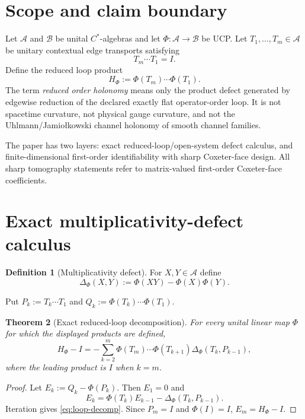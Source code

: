 \documentclass[11pt]{article}
\newtheorem{theorem}{Theorem}[section]
\theoremstyle{definition}
\newtheorem{definition}[theorem]{Definition}
\theoremstyle{remark}
\begin{document}
\section{Scope and claim boundary}
Let $\mathcal A$ and $\mathcal B$ be unital $C^*$-algebras and let $\Phi:\mathcal A\to\mathcal B$ be UCP. Let $T_1,\dots,T_m\in\mathcal A$ be unitary contextual edge transports satisfying
\begin{equation}\label{eq:flat-loop}
T_m\cdots T_1=I.
\end{equation}
Define the reduced loop product
\begin{equation}\label{eq:reduced-loop}
H_\Phi:=\Phi(T_m)\cdots\Phi(T_1).
\end{equation}
The term \emph{reduced order holonomy} means only the product defect generated by edgewise reduction of the declared exactly flat operator-order loop. It is not spacetime curvature, not physical gauge curvature, and not the Uhlmann/Jamio\l kowski channel holonomy of smooth channel families.

The paper has two layers: exact reduced-loop/open-system defect calculus, and finite-dimensional first-order identifiability with sharp Coxeter-face design. All sharp tomography statements refer to matrix-valued first-order Coxeter-face coefficients.

\section{Exact multiplicativity-defect calculus}
\begin{definition}[Multiplicativity defect]\label{def:delta}
For $X,Y\in\mathcal A$ define
\begin{equation}\label{eq:delta}
\Delta_\Phi(X,Y):=\Phi(XY)-\Phi(X)\Phi(Y).
\end{equation}
\end{definition}
Put $P_k:=T_k\cdots T_1$ and $Q_k:=\Phi(T_k)\cdots\Phi(T_1)$.

\begin{theorem}[Exact reduced-loop decomposition]\label{thm:loop-decomp}
For every unital linear map $\Phi$ for which the displayed products are defined,
\begin{equation}\label{eq:loop-decomp}
H_\Phi-I
=-\sum_{k=2}^{m}
\Phi(T_m)\cdots\Phi(T_{k+1})
\Delta_\Phi(T_k,P_{k-1}),
\end{equation}
where the leading product is $I$ when $k=m$.
\end{theorem}
\begin{proof}
Let $E_k:=Q_k-\Phi(P_k)$. Then $E_1=0$ and
\[
E_k=\Phi(T_k)E_{k-1}-\Delta_\Phi(T_k,P_{k-1}).
\]
Iteration gives \eqref{eq:loop-decomp}. Since $P_m=I$ and $\Phi(I)=I$, $E_m=H_\Phi-I$.
\end{proof}
\end{document}
